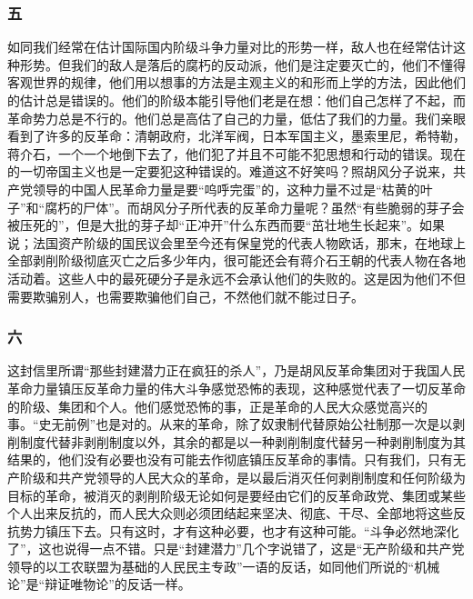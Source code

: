 \documentclass[cn,11pt,chinese]{elegantbook}
\def\myformat#1{\hfil\hfil #1}
\begin{document}
\subsubsection*{\myformat{五}}
如同我们经常在估计国际国内阶级斗争力量对比的形势一样，敌人也在经常估计这种形势。但我们的敌人是落后的腐朽的反动派，他们是注定要灭亡的，他们不懂得客观世界的规律，他们用以想事的方法是主观主义的和形而上学的方法，因此他们的估计总是错误的。他们的阶级本能引导他们老是在想：他们自己怎样了不起，而革命势力总是不行的。他们总是高估了自己的力量，低估了我们的力量。我们亲眼看到了许多的反革命：清朝政府，北洋军阀，日本军国主义，墨索里尼，希特勒，蒋介石，一个一个地倒下去了，他们犯了并且不可能不犯思想和行动的错误。现在的一切帝国主义也是一定要犯这种错误的。难道这不好笑吗？照胡风分子说来，共产党领导的中国人民革命力量是要“呜呼完蛋”的，这种力量不过是“枯黄的叶子”和“腐朽的尸体”。而胡风分子所代表的反革命力量呢？虽然“有些脆弱的芽子会被压死的”，但是大批的芽子却“正冲开”什么东西而要“茁壮地生长起来”。如果说；法国资产阶级的国民议会里至今还有保皇党的代表人物欧话，那末，在地球上全部剥削阶级彻底灭亡之后多少年内，很可能还会有蒋介石王朝的代表人物在各地活动着。这些人中的最死硬分子是永远不会承认他们的失败的。这是因为他们不但需要欺骗别人，也需要欺骗他们自己，不然他们就不能过日子。\\
\subsubsection*{\myformat{六}}
这封信里所谓“那些封建潜力正在疯狂的杀人”，乃是胡风反革命集团对于我国人民革命力量镇压反革命力量的伟大斗争感觉恐怖的表现，这种感觉代表了一切反革命的阶级、集团和个人。他们感觉恐怖的事，正是革命的人民大众感觉高兴的事。“史无前例”也是对的。从来的革命，除了奴隶制代替原始公社制那一次是以剥削制度代替非剥削制度以外，其余的都是以一种剥削制度代替另一种剥削制度为其结果的，他们没有必要也没有可能去作彻底镇压反革命的事情。只有我们，只有无产阶级和共产党领导的人民大众的革命，是以最后消灭任何剥削制度和任何阶级为目标的革命，被消灭的剥削阶级无论如何是要经由它们的反革命政党、集团或某些个人出来反抗的，而人民大众则必须团结起来坚决、彻底、干尽、全部地将这些反抗势力镇压下去。只有这时，才有这种必要，也才有这种可能。“斗争必然地深化了”，这也说得一点不错。只是“封建潜力”几个字说错了，这是“无产阶级和共产党领导的以工农联盟为基础的人民民主专政”一语的反话，如同他们所说的“机械论”是“辩证唯物论”的反话一样。\\
\end{document}
